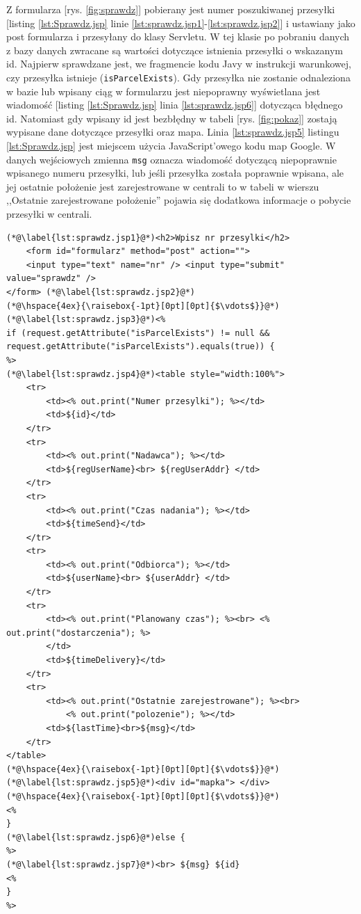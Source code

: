 \documentclass[eng,printmode,oneside]{mgr}
\begin{document}
Z formularza [rys. \ref{fig:sprawdz}] pobierany jest numer poszukiwanej
przesyłki [listing \ref{lst:Sprawdz.jsp} linie
\ref{lst:sprawdz.jsp1}-\ref{lst:sprawdz.jsp2}] i ustawiany jako post formularza
i przesyłany do klasy Servletu. W tej klasie po pobraniu danych z bazy danych
zwracane są wartości dotyczące istnienia przesyłki o wskazanym id. Najpierw
sprawdzane jest, we fragmencie kodu Javy w instrukcji warunkowej, czy przesyłka
istnieje (\texttt{isParcelExists}). Gdy przesyłka nie zostanie odnaleziona w
bazie lub wpisany ciąg w formularzu jest niepoprawny wyświetlana jest wiadomość
[listing \ref{lst:Sprawdz.jsp} linia \ref{lst:sprawdz.jsp6}] dotycząca błędnego
id. Natomiast gdy wpisany id jest bezbłędny w tabeli [rys.
\ref{fig:pokaz}] zostają wypisane dane dotyczące przesyłki oraz mapa. Linia
\ref{lst:sprawdz.jsp5} listingu \ref{lst:Sprawdz.jsp} jest miejscem użycia
JavaScript'owego kodu map Google. W danych wejściowych zmienna \texttt{msg}
oznacza wiadomość dotyczącą niepoprawnie wpisanego numeru przesyłki, lub jeśli
przesyłka została poprawnie wpisana, ale jej ostatnie położenie jest
zarejestrowane w centrali to w tabeli w wierszu ,,Ostatnie zarejestrowane
położenie'' pojawia się dodatkowa informacje o pobycie przesyłki w centrali.

\begin{lstlisting}[caption=Ciało pliku JavaServlet Pages -
sprawdz.jsp,label=lst:Sprawdz.jsp] 
(*@\label{lst:sprawdz.jsp1}@*)<h2>Wpisz nr przesylki</h2> 
	<form id="formularz" method="post" action=""> 
	<input type="text" name="nr" /> <input type="submit" value="sprawdz" />
</form> (*@\label{lst:sprawdz.jsp2}@*)
(*@\hspace{4ex}{\raisebox{-1pt}[0pt][0pt]{$\vdots$}}@*)
(*@\label{lst:sprawdz.jsp3}@*)<%
if (request.getAttribute("isParcelExists") != null &&
request.getAttribute("isParcelExists").equals(true)) {
%>
(*@\label{lst:sprawdz.jsp4}@*)<table style="width:100%">
	<tr>
		<td><% out.print("Numer przesylki"); %></td>
		<td>${id}</td>
	</tr>
	<tr>
		<td><% out.print("Nadawca"); %></td>
		<td>${regUserName}<br> ${regUserAddr} </td>
	</tr>
	<tr>
		<td><% out.print("Czas nadania"); %></td>
		<td>${timeSend}</td>
	</tr>
	<tr>
		<td><% out.print("Odbiorca"); %></td>
		<td>${userName}<br> ${userAddr} </td>
	</tr>
	<tr>
		<td><% out.print("Planowany czas"); %><br> <% out.print("dostarczenia"); %>
		</td>
		<td>${timeDelivery}</td>
	</tr>
	<tr>
		<td><% out.print("Ostatnie zarejestrowane"); %><br>
			<% out.print("polozenie"); %></td>
		<td>${lastTime}<br>${msg}</td>
	</tr>
</table>
(*@\hspace{4ex}{\raisebox{-1pt}[0pt][0pt]{$\vdots$}}@*)
(*@\label{lst:sprawdz.jsp5}@*)<div id="mapka"> </div>
(*@\hspace{4ex}{\raisebox{-1pt}[0pt][0pt]{$\vdots$}}@*)
<%
}
(*@\label{lst:sprawdz.jsp6}@*)else {
%>
(*@\label{lst:sprawdz.jsp7}@*)<br> ${msg} ${id}
<% 
}
%>
\end{lstlisting}
\end{document}
